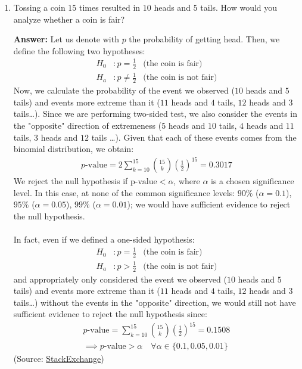 \documentclass{article}
\newenvironment{QandA}{\begin{enumerate}[label=\arabic*.]}{\end{enumerate}}
\newenvironment{answer}{\par\normalfont \textbf{Answer:}}{}
\begin{document}
\begin{QandA}
    \item Tossing a coin $15$ times resulted in $10$ heads and $5$ tails. How would you analyze whether a coin is fair?
    \begin{answer}
        Let us denote with $p$ the probability of getting head. Then, we define the following two hypotheses:
        \begin{align*}
            H_0&: p = \frac{1}{2} &\text{(the coin is fair)} \\
            H_a&: p \neq \frac{1}{2} &\text{(the coin is not fair)}
        \end{align*}
        Now, we calculate the probability of the event we observed ($10$ heads and $5$ tails) and events more extreme than it ($11$ heads and $4$ tails, $12$ heads and $3$ tails\ldots). Since we are performing two-sided test, we also consider the events in the "opposite" direction of extremeness ($5$ heads and $10$ tails, $4$ heads and $11$ tails, $3$ heads and $12$ tails \ldots). Given that each of these events comes from the binomial distribution, we obtain:
        \begin{align*}
            p\text{-value} = 2 \sum_{k=10}^{15} {15 \choose k} \left(\frac{1}{2}\right)^{15} = 0.3017
        \end{align*}
        We reject the null hypothesis if p$\text{-value} < \alpha$, where $\alpha$ is a chosen significance level. In this case, at none of the common significance levels: $90\%$ ($\alpha=0.1$), $95\%$ ($\alpha=0.05$), $99\%$ ($\alpha = 0.01$); we would have sufficient evidence to reject the null hypothesis.\\\\
        In fact, even if we defined a one-sided hypothesis:
        \begin{align*}
            H_0&: p = \frac{1}{2} &\text{(the coin is fair)} \\
            H_a&: p > \frac{1}{2} &\text{(the coin is not fair)}
        \end{align*}
        and appropriately only considered the event we observed ($10$ heads and $5$ tails) and events more extreme than it ($11$ heads and $4$ tails, $12$ heads and $3$ tails\ldots) without the events in the "opposite" direction, we would still not have sufficient evidence to reject the null hypothesis since:
        \begin{align*}
            p\text{-value} = \sum_{k=10}^{15} {15 \choose k} \left(\frac{1}{2}\right)^{15} = 0.1508 \\
            \implies p\text{-value} > \alpha \quad \forall \alpha \in \{0.1, 0.05, 0.01\}
        \end{align*}
        (Source: \href{https://stats.stackexchange.com/questions/21581/how-to-assess-whether-a-coin-tossed-900-times-and-comes-up-heads-490-times-is-bi}{StackExchange})
    \end{answer}


\end{QandA}
\end{document}
